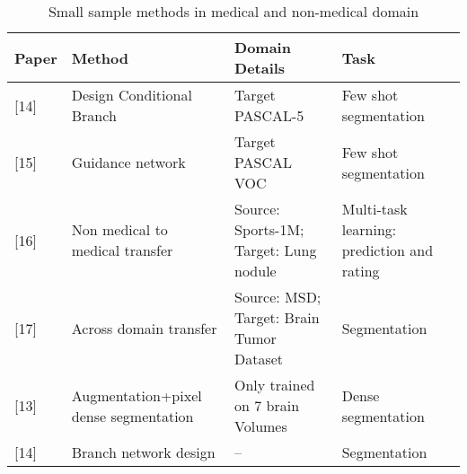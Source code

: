 \begin{table}
\begin{tabular}{p{1cm} p{5cm} p{4cm} p{4cm}}
\hline
Paper    & Method                                & Domain Details                                          & Task                                       \\
\hline
{[}14{]} & Design Conditional Branch             & Target PASCAL-5        & Few shot segmentation                      \\
{[}15{]} & Guidance network                      & Target PASCAL VOC             & Few shot segmentation                      \\
{[}16{]} & Non medical to medical transfer       & Source: Sports-1M;  Target: Lung nodule                  & Multi-task learning: prediction and rating \\
{[}17{]} & Across domain transfer                & Source: MSD; Target: Brain Tumor Dataset & Segmentation                               \\
{[}13{]} & Augmentation+pixel dense segmentation & Only trained on 7 brain Volumes                         & Dense segmentation                         \\
{[}14{]} & Branch network design                 & --                                                      & Segmentation                               \\
\hline
\end{tabular}
\caption{Small sample methods in medical and non-medical domain}
\label{tab:small sample learning}
\end{table}	



